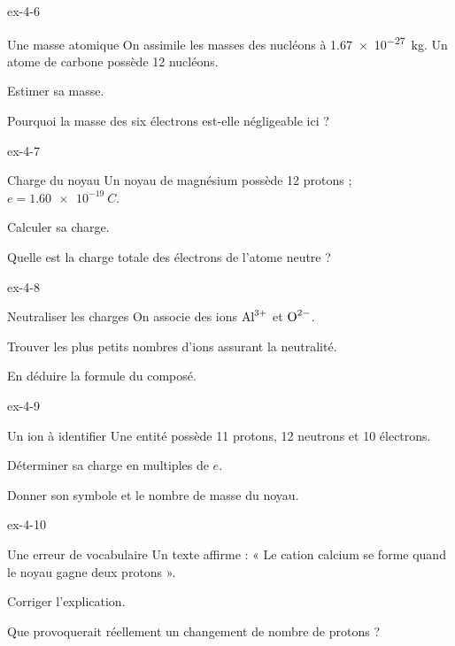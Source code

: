 \begin{blocLivre}{ex-4-6}\begin{exercice}[2]{Une masse atomique}
On assimile les masses des nucléons à \qty{1,67e-27}{kg}. Un atome de carbone possède 12 nucléons.
\begin{questions}
\item Estimer sa masse.
\item Pourquoi la masse des six électrons est-elle négligeable ici ?
\end{questions}
\end{exercice}\end{blocLivre}
\begin{blocLivre}{ex-4-7}\begin{exercice}[2]{Charge du noyau}
Un noyau de magnésium possède 12 protons ; $e=\qty{1,60e-19}{C}$.
\begin{questions}
\item Calculer sa charge.
\item Quelle est la charge totale des électrons de l’atome neutre ?
\end{questions}
\end{exercice}\end{blocLivre}
\begin{blocLivre}{ex-4-8}\begin{exercice}[2]{Neutraliser les charges}
On associe des ions $\ce{Al^{3+}}$ et $\ce{O^{2-}}$.
\begin{questions}
\item Trouver les plus petits nombres d’ions assurant la neutralité.
\item En déduire la formule du composé.
\end{questions}
\end{exercice}\end{blocLivre}
\begin{blocLivre}{ex-4-9}\begin{exercice}[3]{Un ion à identifier}
Une entité possède 11 protons, 12 neutrons et 10 électrons.
\begin{questions}
\item Déterminer sa charge en multiples de $e$.
\item Donner son symbole et le nombre de masse du noyau.
\end{questions}
\end{exercice}\end{blocLivre}
\begin{blocLivre}{ex-4-10}\begin{exercice}[3]{Une erreur de vocabulaire}
Un texte affirme : « Le cation calcium se forme quand le noyau gagne deux protons ».
\begin{questions}
\item Corriger l’explication.
\item Que provoquerait réellement un changement de nombre de protons ?
\end{questions}
\end{exercice}\end{blocLivre}
